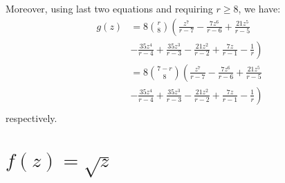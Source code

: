 Moreover, using last two equations and requiring $r \geq 8$, we have:
\begin{displaymath}
\begin{split}
g{\left (z \right )} &= 8 {\binom{r}{8}} \left( \frac{z^{7}}{r - 7} - \frac{7 z^{6}}{r - 6} + \frac{21 z^{5}}{r - 5}\right. \\
& \left. - \frac{35 z^{4}}{r - 4} + \frac{35 z^{3}}{r - 3} - \frac{21 z^{2}}{r - 2} + \frac{7 z}{r - 1} - \frac{1}{r} \right) \\
&= 8 {\binom{7-r}{8}} \left( \frac{z^{7}}{r - 7} - \frac{7 z^{6}}{r - 6} + \frac{21 z^{5}}{r - 5}\right. \\
& \left. - \frac{35 z^{4}}{r - 4} + \frac{35 z^{3}}{r - 3} - \frac{21 z^{2}}{r - 2} + \frac{7 z}{r - 1} - \frac{1}{r} \right) \\
\end{split}
\end{displaymath}
respectively.


\section{$f(z)=\sqrt{z}$}

